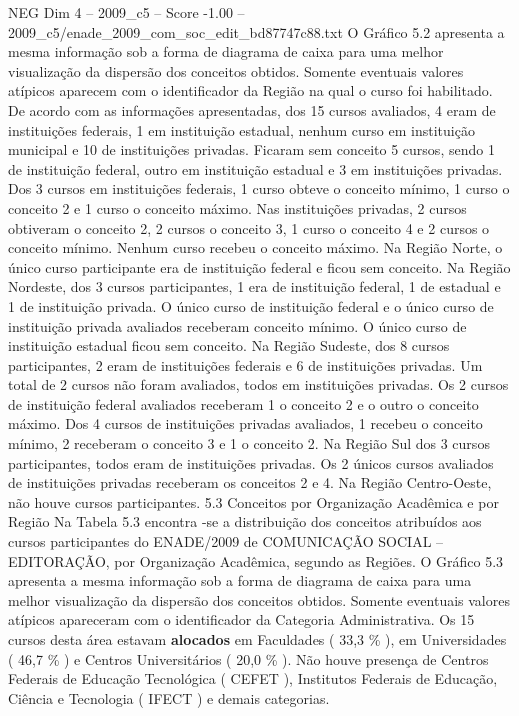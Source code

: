 \begin{textsample}{NEG Dim 4 – 2009\_c5 – Score -1.00 – 2009\_c5/enade\_2009\_com\_soc\_edit\_bd87747c88.txt}
O Gráfico 5.2 apresenta a mesma informação sob a forma de diagrama de caixa para uma melhor visualização da dispersão dos conceitos obtidos.
Somente eventuais valores atípicos aparecem com o identificador da Região na qual o curso foi habilitado.
De acordo com as informações apresentadas, dos 15 cursos avaliados, 4 eram de instituições federais, 1 em instituição estadual, nenhum curso em instituição municipal e 10 de instituições privadas.
Ficaram sem conceito 5 cursos, sendo 1 de instituição federal, outro em instituição estadual e 3 em instituições privadas.
Dos 3 cursos em instituições federais, 1 curso obteve o conceito mínimo, 1 curso o conceito 2 e 1 curso o conceito máximo.
Nas instituições privadas, 2 cursos obtiveram o conceito 2, 2 cursos o conceito 3, 1 curso o conceito 4 e 2 cursos o conceito mínimo.
Nenhum curso recebeu o conceito máximo.
Na Região Norte, o único curso participante era de instituição federal e ficou sem conceito.
Na Região Nordeste, dos 3 cursos participantes, 1 era de instituição federal, 1 de estadual e 1 de instituição privada.
O único curso de instituição federal e o único curso de instituição privada avaliados receberam conceito mínimo.
O único curso de instituição estadual ficou sem conceito.
Na Região Sudeste, dos 8 cursos participantes, 2 eram de instituições federais e 6 de instituições privadas.
Um total de 2 cursos não foram avaliados, todos em instituições privadas.
Os 2 cursos de instituição federal avaliados receberam 1 o conceito 2 e o outro o conceito máximo.
Dos 4 cursos de instituições privadas avaliados, 1 recebeu o conceito mínimo, 2 receberam o conceito 3 e 1 o conceito 2.
Na Região Sul dos 3 cursos participantes, todos eram de instituições privadas.
Os 2 únicos cursos avaliados de instituições privadas receberam os conceitos 2 e 4.
Na Região Centro-Oeste, não houve cursos participantes. 5.3 Conceitos por Organização Acadêmica e por Região Na Tabela 5.3 encontra -se a distribuição dos conceitos atribuídos aos cursos participantes do ENADE/2009 de COMUNICAÇÃO SOCIAL – EDITORAÇÃO, por Organização Acadêmica, segundo as Regiões.
O Gráfico 5.3 apresenta a mesma informação sob a forma de diagrama de caixa para uma melhor visualização da dispersão dos conceitos obtidos.
Somente eventuais valores atípicos apareceram com o identificador da Categoria Administrativa.
Os 15 cursos desta área estavam \textbf{alocados} em Faculdades ( 33,3 \% ), em Universidades ( 46,7 \% ) e Centros Universitários ( 20,0 \% ).
Não houve presença de Centros Federais de Educação Tecnológica ( CEFET ), Institutos Federais de Educação, Ciência e Tecnologia ( IFECT ) e demais categorias.

\end{textsample}
